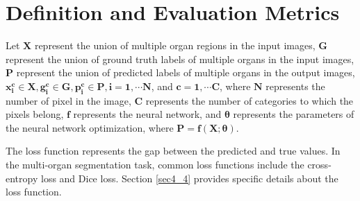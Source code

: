 \documentclass[lettersize,journal]{IEEEtran}
\begin{document}
\section{Definition and Evaluation Metrics}
\label{sec2}
Let $\boldsymbol{X}$ represent the union of multiple organ regions in the input images, $\boldsymbol{G}$ represent the union of ground truth labels of multiple organs in the input images, $\boldsymbol{P}$ represent the union of predicted labels of multiple organs in the output images, $\boldsymbol{x_i^c \in X, g_i^c \in G, p_i^c \in P, i=1, \cdots N}$, and $\boldsymbol{c=1, \cdots C}$, where $\boldsymbol{N}$ represents the number of pixel in the image, $\boldsymbol{C}$ represents the number of categories to which the pixels belong, $\boldsymbol{f}$ represents the neural network, and $\boldsymbol{\theta}$ represents the parameters of the neural network optimization, where $\boldsymbol{P=f(X; \theta)}$.

The loss function represents the gap between the predicted and true values. In the multi-organ segmentation task, common loss functions include the cross-entropy loss and Dice loss. Section \ref{sec4_4} provides specific details about the loss function.
\end{document}
